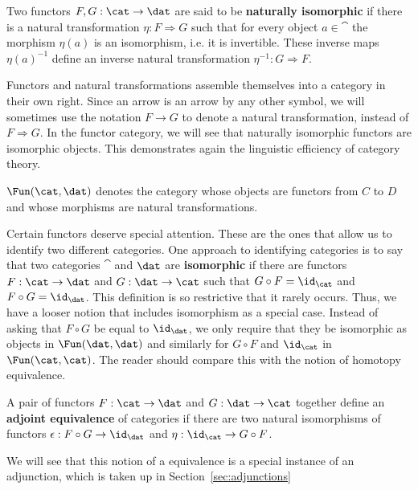\begin{defn}
	Two functors $F,G:\cat\to\dat$ are said to be \textbf{naturally isomorphic} if there is a natural transformation $\eta:F\Rightarrow G$ such that for every object $a\in \cat$ the morphism $\eta(a)$ is an isomorphism, i.e. it is invertible. These inverse maps $\eta(a)^{-1}$ define an inverse natural transformation $\eta^{-1}:G\Rightarrow F$.
\end{defn}

Functors and natural transformations assemble themselves into a category in their own right. Since an arrow is an arrow by any other symbol, we will sometimes use the notation $F\to G$ to denote a natural transformation, instead of $F\Rightarrow G$. In the functor category, we will see that naturally isomorphic functors are isomorphic objects. This demonstrates again the linguistic efficiency of category theory.

\begin{ex}
 $\Fun(\cat,\dat)$ denotes the category whose objects are functors from $C$ to $D$ and whose morphisms are natural transformations.
\end{ex}

Certain functors deserve special attention. These are the ones that allow us to identify two different categories. One approach to identifying categories is to say that two categories $\cat$ and $\dat$ are \textbf{isomorphic} if there are functors $F:\cat\to\dat$ and $G:\dat\to\cat$ such that $G\circ F=\id_{\cat}$ and $F\circ G=\id_{\dat}$. This definition is so restrictive that it rarely occurs. Thus, we have a looser notion that includes isomorphism as a special case. Instead of asking that $F\circ G$ be equal to $\id_{\dat}$, we only require that they be isomorphic as objects in $\Fun(\dat,\dat)$ and similarly for $G\circ F$ and $\id_{\cat}$ in $\Fun(\cat,\cat)$. The reader should compare this with the notion of homotopy equivalence. 

\begin{defn}
A pair of functors $F:\cat\to\dat$ and $G:\dat\to\cat$ together define an \textbf{adjoint equivalence} of categories if there are two natural isomorphisms of functors $\epsilon:F\circ G\to \id_{\dat}$ and $\eta:\id_{\cat}\to G\circ F$.
\end{defn}
We will see that this notion of a equivalence is a special instance of an adjunction, which is taken up in Section~\ref{sec:adjunctions}

